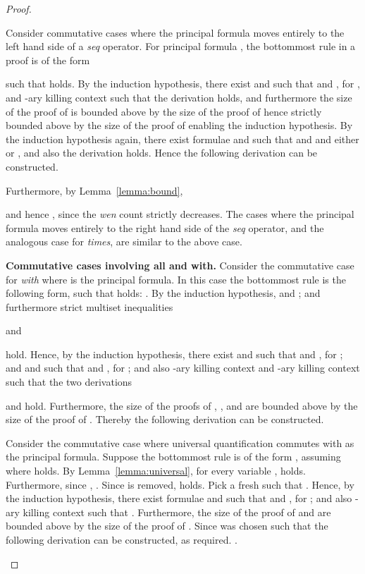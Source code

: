 \begin{proof}
\begin{enumerate}[label=\textbf{\Alph*},ref=\Alph*,leftmargin=*]
{Consider commutative cases where the principal formula moves entirely to the left hand side of a \textit{seq} operator. 
For principal formula , the bottommost rule in a proof is of the form

such that  holds.
By the induction hypothesis, there exist  and  such that  and , for , and -ary killing context  such that the derivation
 holds, 
and furthermore the size of the proof of  is bounded above by the size of the proof of  hence strictly bounded above by the size of the proof of  enabling the induction hypothesis.
By the induction hypothesis again, there exist formulae  and  such that  and  and either  or , and also the derivation  holds.
Hence the following derivation can be constructed.

Furthermore, by Lemma~\ref{lemma:bound},

and hence , since the \textit{wen} count strictly decreases.
The cases where the principal formula moves entirely to the right hand side of the \textit{seq} operator, and the analogous case for \textit{times}, are similar to the above case.






\item \textbf{Commutative cases involving all and with.}
Consider the commutative case for \textit{with} where  is the principal formula. In this case the bottommost rule is the following form, such that  holds:
.
By the induction hypothesis,  and ; and furthermore strict multiset inequalities 

and

hold.
Hence, by the induction hypothesis, there exist  and  such that  and , for ; and  and  such that
 and , for ;
and also -ary killing context  and -ary killing context 
such that the two derivations 

and
 hold.
Furthermore, the size of the proofs of , ,  and  are bounded above by the size of the proof of .
Thereby the following derivation can be constructed.




Consider the commutative case where universal quantification commutes with   as the principal formula. Suppose the bottommost rule is of the form
, 
assuming 
where  holds.
By Lemma~\ref{lemma:universal}, for every variable ,  holds.
Furthermore, since , .
Since  is removed,  holds.
Pick a fresh  such that .
Hence, by the induction hypothesis, there exist formulae  and  such that  and , for ; and also -ary killing context  such that
.
Furthermore, the size of the proof of  and  are bounded above by the size of the proof of .
Since  was chosen such that  the following derivation can be constructed, as required.
.
\smallskip


}
\end{enumerate}
\end{proof}
